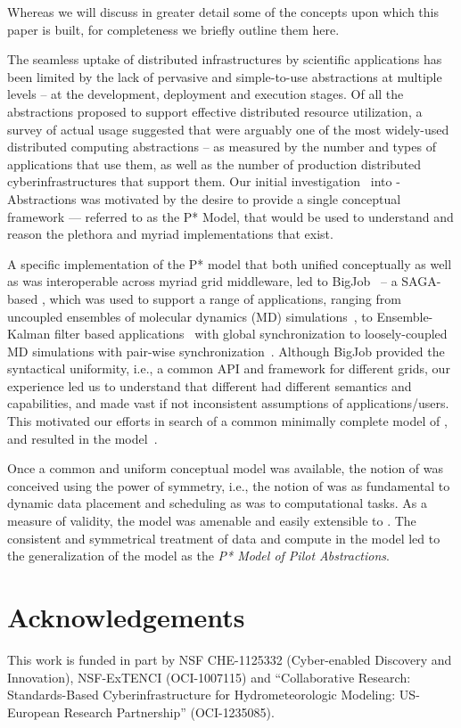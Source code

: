 \documentclass{sig-alternate}
\begin{document}

Whereas we will discuss in greater detail some of the concepts upon
which this paper is built, for completeness we briefly outline them
here.

The seamless uptake of distributed infrastructures by scientific
applications has been limited by the lack of pervasive and
simple-to-use abstractions at multiple levels – at the development,
deployment and execution stages. Of all the abstractions proposed to
support effective distributed resource utilization, a survey of actual
usage suggested that \pilotjobs were arguably one of the most
widely-used distributed computing abstractions – as measured by the
number and types of applications that use them, as well as the number
of production distributed cyberinfrastructures that support them.  Our
initial investigation~\cite{Luckow:2008la} into \pilot-Abstractions
was motivated by the desire to provide a single conceptual framework
--- referred to as the P* Model, that would be used to understand and
reason the plethora and myriad \pilotjob implementations that exist.

A specific implementation of the P* model that both unified
conceptually as well as was interoperable across myriad grid
middleware, led to BigJob~\cite{saga_bigjob_condor_cloud} -- a
SAGA-based \pilotjob, which was used to support a range of
applications, ranging from uncoupled ensembles of molecular dynamics
(MD) simulations~\cite{saga_bigjob_condor_cloud}, to Ensemble-Kalman
filter based applications~\cite{gmac09} with global synchronization to
loosely-coupled MD simulations with pair-wise
synchronization~\cite{async_repex11}.  Although BigJob provided the
syntactical uniformity, i.e., a common API and framework for different
grids, our experience led us to understand that different \pilotjobs
had different semantics and capabilities, and made vast if not
inconsistent assumptions of applications/users. This motivated our
efforts in search of a common minimally complete model of \pilotjobs,
and resulted in the \pstar model~\cite{pstar12}.

Once a common and uniform conceptual model was available, the notion
of \pilotdata was conceived using the power of symmetry, i.e., the
notion of \pilotdata was as fundamental to dynamic data placement and
scheduling as \pilotjobs was to computational tasks. As a measure of
validity, the \pstar model was amenable and easily extensible to
\pilotdata.  The consistent and symmetrical treatment of data and
compute in the model led to the generalization of the model as the
{\it P* Model of Pilot Abstractions}.

\section*{Acknowledgements}

This work is funded in part by NSF CHE-1125332 (Cyber-enabled
Discovery and Innovation), NSF-ExTENCI (OCI-1007115) and
``Collaborative Research: Standards-Based Cyberinfrastructure for
Hydrometeorologic Modeling: US-European Research Partnership''
(OCI-1235085).

% 


\end{document}
